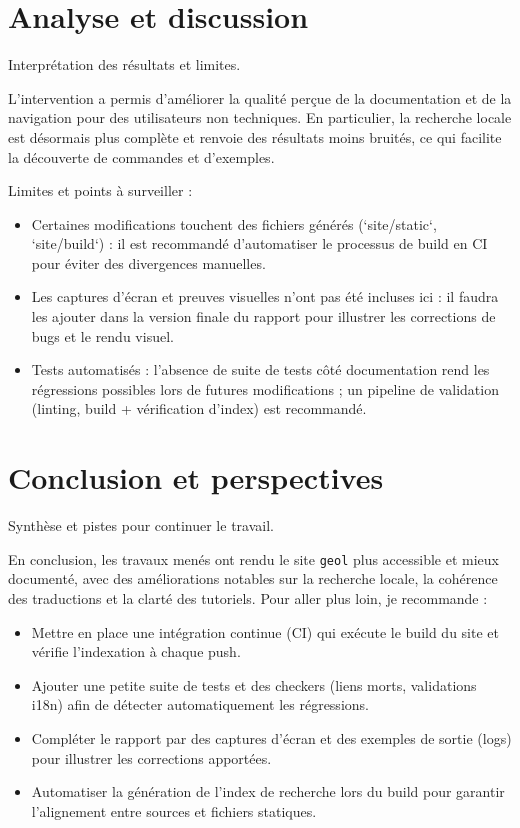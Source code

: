 \documentclass[12pt,a4paper]{report}
\begin{document}
\bigskip

\chapter{Analyse et discussion}
Interprétation des résultats et limites.

L'intervention a permis d'améliorer la qualité perçue de la documentation et de la navigation pour des utilisateurs non techniques. En particulier, la recherche locale est désormais plus complète et renvoie des résultats moins bruités, ce qui facilite la découverte de commandes et d'exemples.

Limites et points à surveiller :
\begin{itemize}
  \item Certaines modifications touchent des fichiers générés (`site/static`, `site/build`) : il est recommandé d'automatiser le processus de build en CI pour éviter des divergences manuelles.
  \item Les captures d'écran et preuves visuelles n'ont pas été incluses ici : il faudra les ajouter dans la version finale du rapport pour illustrer les corrections de bugs et le rendu visuel.
  \item Tests automatisés : l'absence de suite de tests côté documentation rend les régressions possibles lors de futures modifications ; un pipeline de validation (linting, build + vérification d'index) est recommandé.
\end{itemize}

\chapter{Conclusion et perspectives}
Synthèse et pistes pour continuer le travail.

En conclusion, les travaux menés ont rendu le site \texttt{geol} plus accessible et mieux documenté, avec des améliorations notables sur la recherche locale, la cohérence des traductions et la clarté des tutoriels. Pour aller plus loin, je recommande :
\begin{itemize}
  \item Mettre en place une intégration continue (CI) qui exécute le build du site et vérifie l'indexation à chaque push.
  \item Ajouter une petite suite de tests et des checkers (liens morts, validations i18n) afin de détecter automatiquement les régressions.
  \item Compléter le rapport par des captures d'écran et des exemples de sortie (logs) pour illustrer les corrections apportées.
  \item Automatiser la génération de l'index de recherche lors du build pour garantir l'alignement entre sources et fichiers statiques.
\end{itemize}
\end{document}
